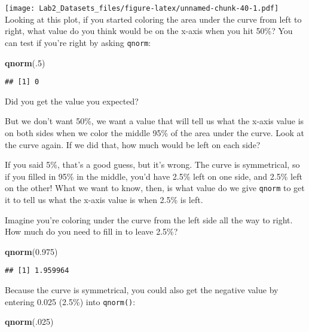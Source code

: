 \documentclass[
]{article}
\newenvironment{Shaded}{\begin{snugshade}}{\end{snugshade}}
\newcommand{\DecValTok}[1]{\textcolor[rgb]{0.00,0.00,0.81}{#1}}
\newcommand{\FloatTok}[1]{\textcolor[rgb]{0.00,0.00,0.81}{#1}}
\newcommand{\FunctionTok}[1]{\textcolor[rgb]{0.13,0.29,0.53}{\textbf{#1}}}
\newcommand{\NormalTok}[1]{#1}
\begin{document}
\texttt{[image: Lab2\_Datasets\_files/figure-latex/unnamed-chunk-40-1.pdf]}
Looking at this plot, if you started coloring the area under the curve
from left to right, what value do you think would be on the x-axis when
you hit 50\%? You can test if you're right by asking \texttt{qnorm}:

\begin{Shaded}
\begin{Highlighting}[]
\FunctionTok{qnorm}\NormalTok{(.}\DecValTok{5}\NormalTok{)}
\end{Highlighting}
\end{Shaded}

\begin{verbatim}
## [1] 0
\end{verbatim}

Did you get the value you expected?

But we don't want 50\%, we want a value that will tell us what the
x-axis value is on both sides when we color the middle 95\% of the area
under the curve. Look at the curve again. If we did that, how much would
be left on each side?

If you said 5\%, that's a good guess, but it's wrong. The curve is
symmetrical, so if you filled in 95\% in the middle, you'd have 2.5\%
left on one side, and 2.5\% left on the other! What we want to know,
then, is what value do we give \texttt{qnorm} to get it to tell us what
the x-axis value is when 2.5\% is left.

Imagine you're coloring under the curve from the left side all the way
to right. How much do you need to fill in to leave 2.5\%?

\begin{Shaded}
\begin{Highlighting}[]
\FunctionTok{qnorm}\NormalTok{(}\FloatTok{0.975}\NormalTok{)}
\end{Highlighting}
\end{Shaded}

\begin{verbatim}
## [1] 1.959964
\end{verbatim}

Because the curve is symmetrical, you could also get the negative value
by entering 0.025 (2.5\%) into \texttt{qnorm()}:

\begin{Shaded}
\begin{Highlighting}[]
\FunctionTok{qnorm}\NormalTok{(.}\DecValTok{025}\NormalTok{)}
\end{Highlighting}
\end{Shaded}
\end{document}
